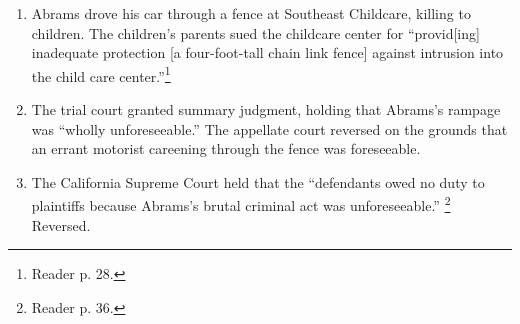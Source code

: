 \begin{enumerate}
    \item Abrams drove his car through a fence at Southeast Childcare, killing 
    to children. The children's parents sued the childcare center for 
    ``provid[ing] inadequate protection [a four-foot-tall chain link fence] 
    against intrusion into the child care center.''\footnote{Reader p. 28.}
    \item The trial court granted summary judgment, holding that Abrams's 
    rampage was ``wholly unforeseeable.'' The appellate court reversed on the 
    grounds that an errant motorist careening through the fence was 
    foreseeable.
    \item The California Supreme Court held that the ``defendants owed no duty 
    to plaintiffs because Abrams's brutal criminal act was unforeseeable.'' 
    \footnote{Reader p. 36.} Reversed.
\end{enumerate}

